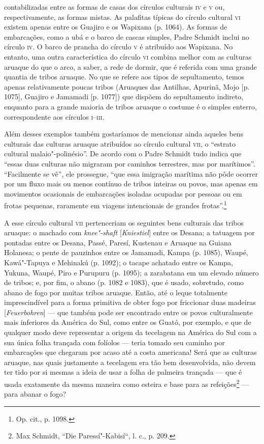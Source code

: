contabilizadas entre as formas de casas dos círculos culturais \textsc{iv} e \textsc{v}
ou, respectivamente, as formas mistas. As palafitas típicas do círculo
cultural \textsc{vi} existem apenas entre os Guajiro e os Wapixana (p. 1064). As
formas de embarcações, como a ubá e o barco de cascas simples, Padre
Schmidt inclui no círculo \textsc{iv}. O barco de prancha do círculo \textsc{v} é
atribuído aos Wapixana. No entanto, uma outra característica do círculo
\textsc{vi} combina melhor com as culturas aruaque do que o arco, a saber, a rede
de dormir, que é referida com uma grande quantia de tribos aruaque. No
que se refere aos tipos de sepultamento, temos apenas relativamente
poucas tribos (Aruaques das Antilhas, Apurinã, Mojo {[}p. 1075{]},
Guajiro e Jamamadi {[}p. 1077{]}) que dispõem do sepultamento indireto,
enquanto para a grande maioria de tribos aruaque o costume é o simples
enterro, correspondente aos círculos \textsc{i--iii}.

Além desses exemplos também gostaríamos de mencionar ainda aqueles bens
culturais das culturas aruaque atribuídos ao círculo cultural \textsc{vii}, o
``estrato cultural malaio"-polinésio''. De acordo com o Padre Schmidt
tudo indica que ``essas duas culturas não migraram por caminhos
terrestres, mas por marítimos''. ``Facilmente se vê'', ele prossegue,
``que essa imigração marítima não pôde ocorrer por um fluxo mais ou
menos contínuo de tribos inteiras ou povos, mas apenas em movimentos
ocasionais de embarcações isoladas ocupadas por pessoas ou em frotas
pequenas, raramente em viagens intencionais de grandes
frotas''.\footnote{Op. cit., p. 1098.}

A esse círculo cultural \textsc{vii} pertenceriam os seguintes bens culturais das
tribos aruaque: o machado com \emph{knee"-shaft} {[}\emph{Kniestiel}{]}
entre os Desana; a tatuagem por pontadas entre os Desana, Passé, Paresí,
Kustenau e Aruaque na Guiana Holanesa; o pente de pauzinhos entre os
Jamamadi, Kampa (p. 1085), Waupé, Kawá"-Tapuya e Mehinakú (p. 1092); o
tacape achatado entre os Kampa, Yukuna, Waupé, Piro e Purupuru (p.
1095); a zarabatana em um elevado número de tribos; e, por fim, o abano
(p. 1082 e 1083), que é usado, sobretudo, como abano de fogo por muitas
tribos aruaque. Então, até o leque totalmente imprescindível para a
forma primitiva de obter fogo por friccionar duas madeiras
{[}\emph{Feuerbohren}{]} --- que também pode ser encontrado entre os
povos culturalmente mais inferiores da América do Sul, como entre os
Guató, por exemplo, e que de qualquer modo deve representar a origem da
tecelagem na América do Sul com a sua única folha trançada com folíolos
--- teria tomado seu caminho por embarcações que chegaram por acaso até a
costa americana! Será que as culturas aruaque, nas quais justamente a
tecelagem era tão bem desenvolvida, não devem ter tido por si mesmas a
ideia de usar a folha de palmeira trançada --- que é usada exatamente da
mesma maneira como esteira e base para as refeições\footnote{Max
  Schmidt, ``Die Paressí"-Kabisí``, l. c., p. 209.} --- para abanar o
fogo?

